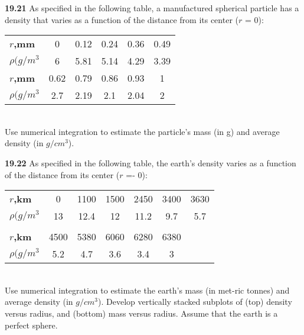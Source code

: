 \documentclass[../main.tex]{subfiles}
\begin{document}
\begin{multicols}{2}
\textbf{19.21} As specified in the following table, a manufactured
spherical particle has a density that varies as a function of the
distance from its center ($r$ = 0):\\
\begin{tabular}{lccccc}
	\hline
	\scriptsize{\textbf{$r$,mm}} & \scriptsize{0} & \scriptsize{0.12} & \scriptsize{0.24} & \scriptsize{0.36} & \scriptsize{0.49}\\
	\scriptsize{\textbf{$\rho(g/m^{3}$}} & \scriptsize{6} & \scriptsize{5.81} & \scriptsize{5.14} & \scriptsize{4.29} & \scriptsize{3.39}
	\vspace{0in}\\
	\scriptsize{\textbf{$r$,mm}} & \scriptsize{0.62} & \scriptsize{0.79} & \scriptsize{0.86} & \scriptsize{0.93} & \scriptsize{1}\\
	\scriptsize{\textbf{$\rho(g/m^{3}$}} & \scriptsize{2.7} & \scriptsize{2.19} & \scriptsize{2.1} & \scriptsize{2.04} & \scriptsize{2}\\ 	\hline
\end{tabular}
\vspace{0.2in}\\
Use numerical integration to estimate the particle's mass
(in g) and average density (in $g/cm^3$).

\textbf{19.22} As specified in the following table, the earth's density
varies as a function of the distance from its center ($r$ =- 0):\\
\begin{tabular}{lcccccc}
	\hline
	\scriptsize{\textbf{$r$,km}} & \scriptsize{0} & \scriptsize{1100} & \scriptsize{1500} & \scriptsize{2450} & \scriptsize{3400} & \scriptsize{3630}\\
	\scriptsize{\textbf{$\rho(g/m^{3}$}} & \scriptsize{13} & \scriptsize{12.4} & \scriptsize{12} & \scriptsize{11.2} & \scriptsize{9.7} & \scriptsize{5.7}\\
	\vspace{0in}\\
	\scriptsize{\textbf{$r$,km}} & \scriptsize{4500} & \scriptsize{5380} & \scriptsize{6060} & \scriptsize{6280} & \scriptsize{6380}\\
	\scriptsize{\textbf{$\rho(g/m^{3}$}} & \scriptsize{5.2} & \scriptsize{4.7} & \scriptsize{3.6} & \scriptsize{3.4} & \scriptsize{3}\\
	\hline
\end{tabular}
\vspace{0.2in}\\
Use numerical integration to estimate the earth's mass (in met-ric tonnes) and average density (in $g/cm^3$). Develop vertically stacked subplots of (top) density versus radius, and (bottom) mass versus radius. Assume that the earth is a perfect sphere.
	



\end{multicols}
\end{document}
